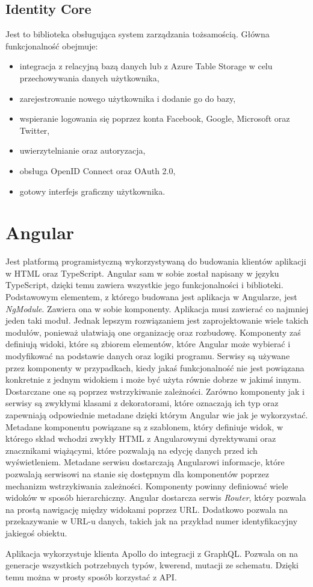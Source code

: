 \subsection{Identity Core}
Jest to biblioteka obsługująca system zarządzania tożsamością. Główna funkcjonalność obejmuje:
\begin{itemize}
    \item integracja z relacyjną bazą danych lub z Azure Table Storage w celu przechowywania danych użytkownika,
    \item zarejestrowanie nowego użytkownika i dodanie go do bazy,
    \item wspieranie logowania się poprzez konta Facebook, Google, Microsoft oraz Twitter,
    \item uwierzytelnianie oraz autoryzacja,
    \item obsługa OpenID Connect oraz OAuth 2.0,
    \item gotowy interfejs graficzny użytkownika.
\end{itemize}

\section{Angular}
Jest platformą programistyczną wykorzystywaną do budowania klientów aplikacji w HTML oraz TypeScript.\cite{angulararch} Angular sam w sobie został napisany w języku TypeScript, dzięki temu zawiera wszystkie jego funkcjonalności i biblioteki. Podstawowym elementem, z którego budowana jest aplikacja w Angularze, jest \textit{NgModule}. Zawiera ona w sobie komponenty. Aplikacja musi zawierać co najmniej jeden taki moduł. Jednak lepszym rozwiązaniem jest zaprojektowanie wiele takich modułów, ponieważ ułatwiają one organizację oraz rozbudowę. Komponenty zaś definiują widoki, które są zbiorem elementów, które Angular może wybierać i modyfikować na podstawie danych oraz logiki programu. Serwisy są używane przez komponenty w przypadkach, kiedy jakaś funkcjonalność nie jest powiązana konkretnie z jednym widokiem i może być użyta równie dobrze w jakimś innym. Dostarczane one są poprzez wstrzykiwanie zależności. Zarówno komponenty jak i serwisy są zwykłymi klasami z dekoratorami, które oznaczają ich typ oraz zapewniają odpowiednie metadane dzięki którym Angular wie jak je wykorzystać. Metadane komponentu powiązane są z szablonem, który definiuje widok, w którego skład wchodzi zwykły HTML z Angularowymi dyrektywami oraz znacznikami wiążącymi, które pozwalają na edycję danych przed ich wyświetleniem. Metadane serwisu dostarczają Angularowi informacje, które pozwalają serwisowi na stanie się dostępnym dla komponentów poprzez mechanizm wstrzykiwania zależności. Komponenty powinny definiować wiele widoków w sposób hierarchiczny. Angular dostarcza serwis \textit{Router}, który pozwala na prostą nawigację między widokami poprzez URL. Dodatkowo pozwala na przekazywanie w URL-u danych, takich jak na przykład numer identyfikacyjny jakiegoś obiektu.

Aplikacja wykorzystuje klienta Apollo do integracji z GraphQL. Pozwala on na generacje wszystkich potrzebnych typów, kwerend, mutacji ze schematu. Dzięki temu można w prosty sposób korzystać z API.
